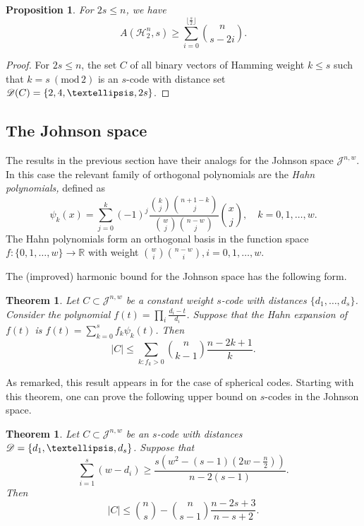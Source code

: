\documentclass{amsart}
\newtheorem{theoremenv}[definitionenv]{Theorem}
\newtheorem{propositionenv}[definitionenv]{Proposition}
\newenvironment{theorem}{\begin{theoremenv}\rm}{\end{theoremenv}}
\newenvironment{proposition}{\begin{propositionenv}\rm}{\end{propositionenv}}
\newcommand{\cH}{\mathcal{H}}
\newcommand{\cJ}{\mathcal{J}}
\begin{document}
\begin{proposition}\cite[Eq.$(3.1)$]{MN11} 
\label{prop_ham_low}
For $2s \leq n$, we have
\begin{equation*}
    A(\cH_{2}^{n}, s) \geq \sum_{i = 0}^{\lfloor \frac{s}{2} \rfloor} \binom{n}{s-2i}.
\end{equation*}
\end{proposition}

\begin{proof}
For  $2s \leq n$,  the set $C$ of all binary vectors of Hamming weight  $k\leq s$ such that 
$k=s~(\text{mod}\, 2)$ is an $s$-code with distance set $\sD(C)=\{2, 4, \dots, 2s\}$.
\end{proof}

\subsection{The Johnson space} The results in the previous section have their analogs for the 
Johnson space $\cJ^{n, w}.$ 
In this case the relevant family of orthogonal polynomials are the {\em Hahn polynomials,} defined as
   \begin{equation}\label{eq:Hahn}
    \psi_{k}(x) = \sum_{j = 0}^{k} (-1)^{j}\frac{\binom{k}{j} \binom{n+1-k}{j}}{\binom{w}{j} \binom{n-w}{j}} \binom{x}{j},\quad k=0,1,\dots,w.
   \end{equation}
The Hahn polynomials form an orthogonal basis in the function space $f:\{0,1,\dots,w\}\to {\mathbb R}$ with weight
$\binom wi\binom{n-w}i,i=0,1,\dots,w.$


The (improved) harmonic bound for the Johnson space has the following form. 
\begin{theorem}\cite{NS10}\label{thm:JNS}
Let $C \subset \cJ^{n, w}$ be a constant weight $s$-code with distances $\{d_{1}, \dots, d_{s}\}$. Consider the polynomial $f(t) = \prod_{i} \frac{d_{i}-t}{d_{i}}$. Suppose that the Hahn expansion of $f(t)$ is   $f(t) = \sum_{k = 0}^{s}f_{k}\psi_k(t)$. Then
    $$
|C| \leq \sum_{k: f_{k} > 0} \binom n{k-1}\frac{n-2k+1}k.
    $$
\end{theorem}
As remarked, this result appears in \cite{NS10} for the case of spherical codes. Starting with this theorem, one can prove 
the following upper bound on $s$-codes in the Johnson space.

\begin{theorem}\cite[Theorem $8$]{BM11}
\label{thm:Jon_BM_upp}
Let $C \subset \cJ^{n, w}$ be an $s$-code with distances $\sD=\{d_{1}, \dots, d_{s}\}$. Suppose that
\begin{equation*}
    \sum_{i = 1}^{s} (w-d_{i}) \geq \frac{s(w^{2}-(s-1)(2w-\frac{n}{2}))}{n-2(s-1)}.
\end{equation*}
Then
\begin{equation*}
    |C| \leq \binom{n}{s} - \binom{n}{s-1} \frac{n-2s+3}{n-s+2}.
\end{equation*}
\end{theorem}
\end{document}
